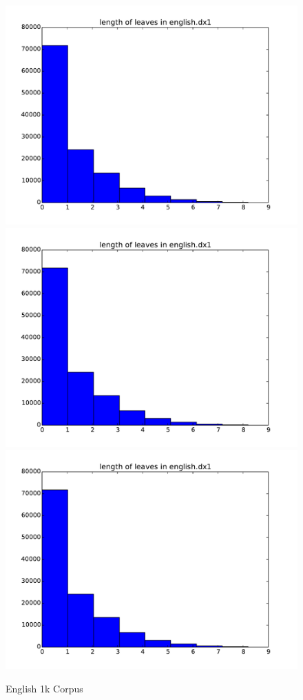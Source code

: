 \documentclass{article}
\begin{document}
		\begin{figure}[H]
		\centering
		\caption{English 1k Corpus}
		\includegraphics[scale=.5,page=1]{english_dx1_histograms.pdf}
		\includegraphics[scale=.5,page=2]{english_dx1_histograms.pdf}
		\includegraphics[scale=.5,page=3]{english_dx1_histograms.pdf}
		\end{figure}
		
\end{document}
